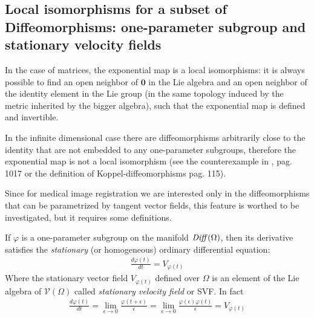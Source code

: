 \subsection{Local isomorphisms for a subset of Diffeomorphisms: one-parameter subgroup and stationary velocity fields}\label{subse:local_isomorphisms}

In the case of matrices, the exponential map is a local isomorphisms: it is always possible to find an open neighbor of $\mathbf{0}$ in the Lie algebra and an open neighbor of the identity element in the Lie group (in the same topology induced by the metric inherited by the bigger algebra), such that the exponential map is defined and invertible.

In the infinite dimensional case there are diffeomorphisms arbitrarily close to the identity that are not embedded to any one-parameter subgroups, therefore the exponential map is not a local isomorphism (see the counterexample in \cite{milnor1984remarks}, pag. 1017 or the definition of Koppel-diffeomorphisms \cite{grabowski1988free} pag. 115).

Since for medical image registration we are interested only in the diffeomorphisms that can be parametrized by tangent vector fields, this feature is worthed to be investigated, but it requires some definitions.

If $\varphi$ is a one-parameter subgroup on the manifold $\text{\emph{Diff}}(\Omega)$, then its derivative satisfies the \emph{stationary} (or homogeneous) ordinary differential equation:
\begin{align}\label{eq:generating_ODE_svf}
\frac{d\varphi(t)}{dt} = V_{\varphi(t)}
\end{align}
Where the stationary vector field $V_{\varphi(t)}$ defined over $\Omega$ is an element of the Lie algebra of $\mathcal{V}(\Omega)$ called \emph{stationary velocity field} or SVF. In fact
\begin{align*}
\frac{d\varphi(t)}{dt} 
= 
\lim_{\epsilon \rightarrow 0} \frac{\varphi(t +\epsilon)}{\epsilon} 
=
\lim_{\epsilon \rightarrow 0} \frac{\varphi(\epsilon) \varphi(t)}{\epsilon} 
=
V_{\varphi(t)}
\end{align*} 

